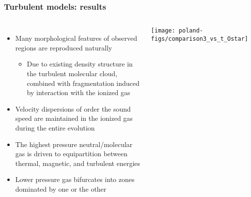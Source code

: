 \documentclass[presentation]{beamer}
\begin{document}


\begin{frame}
  \frametitle{Turbulent models: results}
  \begin{columns}
    \begin{itemize}
    \item Many morphological features of observed \hii{} regions are
      reproduced naturally
      \begin{itemize}
      \item Due to existing density structure in the
        turbulent molecular cloud, combined with fragmentation induced
        by interaction with the ionized gas
      \end{itemize}
    \item Velocity dispersions of order the sound speed are
      maintained in the ionized gas during the entire evolution
    \item The highest pressure neutral/molecular gas is driven to
      equipartition between thermal, magnetic, and turbulent energies
    \item Lower pressure gas bifurcates into zones dominated by one or
      the other
    \end{itemize}
    \texttt{[image: poland-figs/comparison3\_vs\_t\_Ostar]}%
  \end{columns}
\end{frame}
\end{document}
